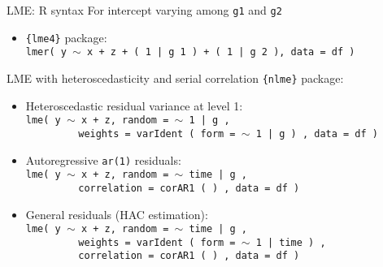 \documentclass{beamer}
\begin{document}
\begin{frame}{LME: R syntax}
\small 
For intercept varying among \texttt{g1} and \texttt{g2} \\
\bigskip
\begin{itemize}
    \bigskip
    \item \texttt{\{lme4\}} package: \\ \medskip
    \texttt{lmer( y $\sim$ x + z + ( 1 | g 1 ) + ( 1 | g 2 ), data = df )}\\
\end{itemize}
\end{frame}
\begin{frame}{LME with heteroscedasticity and serial correlation}
\small 
\texttt{\{nlme\}} package: \\
\bigskip
\begin{itemize}
    \item Heteroscedastic residual variance at level 1:\\ \medskip
    \texttt{lme( y $\sim$ x + z, random = $\sim$ 1 |  g , \\
           ~~~~~~~~~weights = varIdent ( form = $\sim$ 1 | g ) , data = df )}\\
    \bigskip
    \item Autoregressive \texttt{ar(1)} residuals:\\ \medskip
    \texttt{lme( y $\sim$ x + z, random = $\sim$ time |  g , \\
           ~~~~~~~~~correlation = corAR1 ( ) , data = df )}\\
    \bigskip
    \item General residuals (HAC estimation):\\ \medskip
    \texttt{lme( y $\sim$ x + z, random = $\sim$ time |  g , \\
           ~~~~~~~~~weights = varIdent ( form = $\sim$ 1 | time ) , \\
           ~~~~~~~~~correlation = corAR1 ( ) , data = df )}\\
\end{itemize}
\end{frame}
\end{document}
